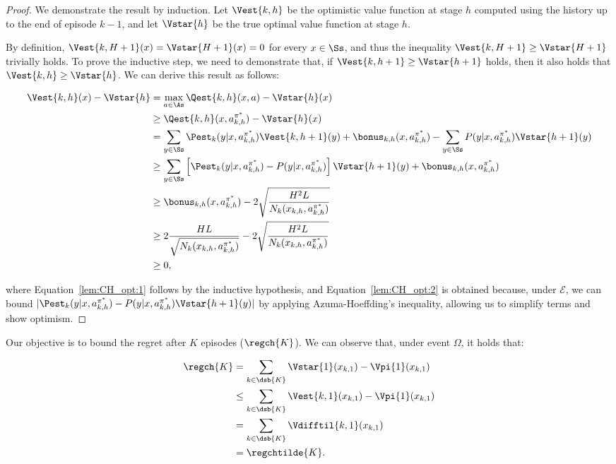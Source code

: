 \begin{proof}
    We demonstrate the result by induction. Let $\Vest{k,h}$ be the optimistic value function at stage $h$ computed using the history up to the end of episode $k-1$, and let $\Vstar{h}$ be the true optimal value function at stage $h$.

    By definition, $\Vest{k,H+1}(x) = \Vstar{H+1}(x) = 0$ for every $x \in \Ss$, and thus the inequality $\Vest{k,H+1} \ge \Vstar{H+1}$ trivially holds. To prove the inductive step, we need to demonstrate that, if $\Vest{k, h+1} \ge \Vstar{h+1}$ holds, then it also holds that $\Vest{k,h} \ge \Vstar{h}$. We can derive this result as follows:

    \begin{align}
        \Vest{k,h}(x) - \Vstar{h} &= \max_{a\in\As} \Qest{k,h}(x,a) - \Vstar{h}(x) \nonumber \\
        &\ge \Qest{k,h}(x, a_{k,h}^{\pi^*}) - \Vstar{h}(x) \nonumber \\
        &= \sum_{y\in\Ss} \Pest_{k}(y | x, a_{k,h}^{\pi^*})\Vest{k,h+1}(y) + \bonus_{k,h}(x, a_{k,h}^{\pi^*}) - \sum_{y\in\Ss} P(y | x, a_{k,h}^{\pi^*})\Vstar{h+1}(y) \nonumber \\
        &\ge \sum_{y \in \Ss} \left[ \Pest_{k}(y | x, a_{k,h}^{\pi^*}) - P(y | x, a_{k,h}^{\pi^*})\right] \Vstar{h+1}(y)  + \bonus_{k,h}(x, a_{k,h}^{\pi^*}) \label{lem:CH_opt:1} \\
        &\ge \bonus_{k,h}(x, a_{k,h}^{\pi^*}) - 2\sqrt{\frac{H^2 L}{N_k(x_{k,h}, a_{k,h}^{\pi^*})}} \label{lem:CH_opt:2} \\
        &\ge 2\frac{H L}{\sqrt{N_k (x_{k,h}, a_{k,h}^{\pi^*})}} - 2\sqrt{\frac{H^2 L}{N_k (x_{k,h}, a_{k,h}^{\pi^*})}} \nonumber \\
        &\ge 0, \nonumber
    \end{align}

    where Equation~\eqref{lem:CH_opt:1} follows by the inductive hypothesis, and Equation~\eqref{lem:CH_opt:2} is obtained because, under $\mathcal{E}$, we can bound $|\Pest_{k}(y | x, a_{k,h}^{\pi^*}) - P(y | x, a_{k,h}^{\pi^*}) \Vstar{h+1}(y)|$ by applying Azuma-Hoeffding's inequality, allowing us to simplify terms and show optimism.
\end{proof}

Our objective is to bound the regret after $K$ episodes (\ie $\regch{K}$). We can observe that, under event $\Omega$, it holds that:

\begin{align*}
    \regch{K} &= \sum_{k \in \dsb{K}} \Vstar{1}(x_{k,1}) - \Vpi{1}(x_{k,1}) \\
    &\le \sum_{k \in \dsb{K}} \Vest{k,1}(x_{k,1}) - \Vpi{1}(x_{k,1}) \\
    &= \sum_{k \in \dsb{K}} \Vdifftil{k,1}(x_{k,1}) \\
    &= \regchtilde{K}.
\end{align*}

